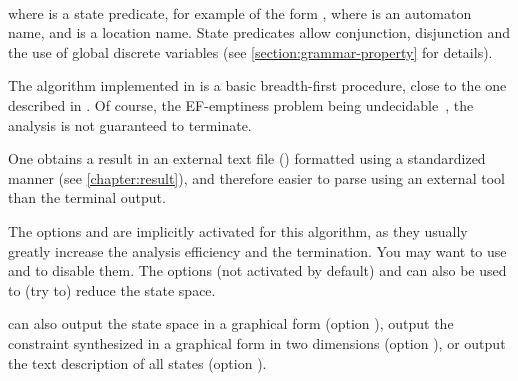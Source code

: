 \\
where  is a state predicate, for example of the form , where  is an automaton name, and  is a location name.
State predicates allow conjunction, disjunction and the use of global discrete variables (see \cref{section:grammar-property} for details).



The algorithm \EFsynth{} implemented in \imitator{} is a basic breadth-first procedure, close to the one described in \cite{JLR15}.
Of course, the EF-emptiness problem being undecidable~\cite{AHV93}, the analysis is not guaranteed to terminate.

%

One obtains a result in an external text file () formatted using a standardized manner (see \cref{chapter:result}), and therefore easier to parse using an external tool than the terminal output.

The options  and  are implicitly activated for this algorithm, as they usually greatly increase the analysis efficiency and the termination.
You may want to use  and  to disable them.
The options  (not activated by default) and  can also be used to (try to) reduce the state space.

\imitator{} can also
output the state space in a graphical form (option ),
output the constraint synthesized in a graphical form in two dimensions (option ),
or
output the text description of all states (option ).


